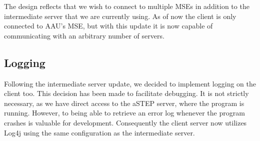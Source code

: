 The design reflects that we wish to connect to multiple MSEs in addition to the intermediate server that we are currently using. As of now the client is only connected to AAU's MSE, but with this update it is now capable of communicating with an arbitrary number of servers.

\subsection*{Logging}
Following the intermediate server update, we decided to implement logging on the client too. This decision has been made to facilitate debugging. It is not strictly necessary, as we have direct access to the aSTEP server, where the program is running. However, to being able to retrieve an error log whenever the program crashes is valuable for development. Consequently the client server now utilizes Log4j \cite{log4j} using the same configuration as the intermediate server.